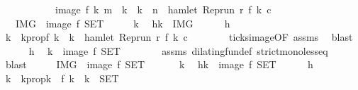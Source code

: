 \begin{isabellebody}
\ \ \ \ \ \ \ \ \ \ {\isacharequal}\ image\ f\ {\isacharbraceleft}k{\isachardot}\ m\ {\isasymle}\ k\ {\isasymand}\ k\ {\isasymle}\ n\ {\isasymand}\ hamlet\ {\isacharparenleft}{\isacharparenleft}Rep{\isacharunderscore}run\ r{\isacharparenright}\ {\isacharparenleft}f\ k{\isacharparenright}\ c{\isacharparenright}{\isacharbraceright}{\isacartoucheclose}\isanewline
\ \ {\isacharparenleft}\ {\isacartoucheopen}{\isacharquery}IMG\ {\isacharequal}\ image\ f\ {\isacharquery}SET{\isacartoucheclose}{\isacharparenright}\isanewline
%
\isadelimproof
%
\endisadelimproof
%
\isatagproof
{}\isamarkupfalse%
\isanewline
\ \ \isacommand{{\isacharbraceleft}}\isamarkupfalse%
\ \isamarkupfalse%
\ k\ \isamarkupfalse%
\ h{\isacharcolon}{\isacartoucheopen}k\ {\isasymin}\ {\isacharquery}IMG{\isacartoucheclose}\isanewline
\ \ \ \ \isamarkupfalse%
\ h\ \isamarkupfalse%
\ k\ \ k{}prop{\isacharcolon}{\isacartoucheopen}f\ k\ {\isacharequal}\ k\ {\isasymand}\ hamlet\ {\isacharparenleft}{\isacharparenleft}Rep{\isacharunderscore}run\ r{\isacharparenright}\ {\isacharparenleft}f\ k\ c{\isacharparenright}{\isacartoucheclose}\isanewline
\ \ \ \ \ \ \isamarkupfalse%
\ ticks{\isacharunderscore}image{\isacharbrackleft}OF\ assms{\isacharbrackright}\ \isamarkupfalse%
\ blast\isanewline
\ \ \ \ \isamarkupfalse%
\ h\ \isamarkupfalse%
\ {\isacartoucheopen}k\ {\isasymin}\ image\ f\ {\isacharquery}SET{\isacartoucheclose}\isanewline
\ \ \ \ \ \ \isamarkupfalse%
\ assms\ dilating{\isacharunderscore}fun{\isacharunderscore}def\ strict{\isacharunderscore}mono{\isacharunderscore}less{\isacharunderscore}eq\ \isamarkupfalse%
\ blast\isanewline
\ \ \isacommand{{\isacharbraceright}}\isamarkupfalse%
\ \isamarkupfalse%
\ {\isacartoucheopen}{\isacharquery}IMG\ {\isasymsubseteq}\ image\ f\ {\isacharquery}SET{\isacartoucheclose}\ \isacommand{{\isachardot}{\isachardot}}\isamarkupfalse%
\isanewline
{}\isamarkupfalse%
\isanewline
\ \ \isacommand{{\isacharbraceleft}}\isamarkupfalse%
\ \isamarkupfalse%
\ k\ \isamarkupfalse%
\ h{\isacharcolon}{\isacartoucheopen}k\ {\isasymin}\ image\ f\ {\isacharquery}SET{\isacartoucheclose}\isanewline
\ \ \ \ \isamarkupfalse%
\ h\ \isamarkupfalse%
\ k\ \ k{}prop{\isacharcolon}{\isacartoucheopen}k\ {\isacharequal}\ f\ k\ {\isasymand}\ k\ {\isasymin}\ {\isacharquery}SET{\isacartoucheclose}\ \isamarkupfalse%

\end{isabellebody}
